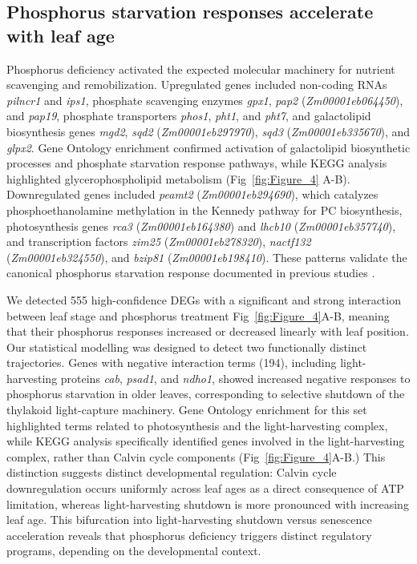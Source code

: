 \documentclass[9pt,twocolumn,twoside]{rilabRxiv}
\begin{document}
\subsection*{Phosphorus starvation responses accelerate with leaf age}

Phosphorus deficiency activated the expected molecular machinery for nutrient scavenging and remobilization.
Upregulated genes included non-coding RNAs \textit{pilncr1} and \textit{ips1}, phosphate scavenging enzymes \textit{gpx1}, \textit{pap2} (\textit{Zm00001eb064450}), and \textit{pap19}, phosphate transporters \textit{phos1}, \textit{pht1}, and \textit{pht7}, and galactolipid biosynthesis genes \textit{mgd2}, \textit{sqd2} (\textit{Zm00001eb297970}), \textit{sqd3} (\textit{Zm00001eb335670}), and \textit{glpx2}.
Gene Ontology enrichment confirmed activation of galactolipid biosynthetic processes and phosphate starvation response pathways, while KEGG analysis highlighted glycerophospholipid metabolism (Fig~\ref{fig:Figure_4} A-B). 
Downregulated genes included \textit{peamt2} (\textit{Zm00001eb294690}), which catalyzes phosphoethanolamine methylation in the Kennedy pathway for PC biosynthesis, photosynthesis genes \textit{rca3} (\textit{Zm00001eb164380}) and \textit{lhcb10} (\textit{Zm00001eb357740}), and transcription factors \textit{zim25} (\textit{Zm00001eb278320}), \textit{nactf132} (\textit{Zm00001eb324550}), and \textit{bzip81} (\textit{Zm00001eb198410}).
These patterns validate the canonical phosphorus starvation response documented in previous studies \cite{wang2020a,he2022}.

We detected 555 high-confidence DEGs with a significant and strong interaction between leaf stage and phosphorus treatment Fig~\ref{fig:Figure_4}A-B, meaning that their phosphorus responses increased or decreased linearly with leaf position.
Our statistical modelling was designed to detect two functionally distinct trajectories.
Genes with negative interaction terms (194), including light-harvesting proteins \textit{cab}, \textit{psad1}, and \textit{ndho1}, showed increased negative responses to phosphorus starvation in older leaves, corresponding to selective shutdown of the thylakoid light-capture machinery.
Gene Ontology enrichment for this set highlighted terms related to photosynthesis and the light-harvesting complex, while KEGG analysis specifically identified genes involved in the light-harvesting complex, rather than Calvin cycle components (Fig~\ref{fig:Figure_4}A-B.)
This distinction suggests distinct developmental regulation: Calvin cycle downregulation occurs uniformly across leaf ages as a direct consequence of ATP limitation, whereas light-harvesting shutdown is more pronounced with increasing leaf age.
This bifurcation into light-harvesting shutdown versus senescence acceleration reveals that phosphorus deficiency triggers distinct regulatory programs, depending on the developmental context.
\end{document}
